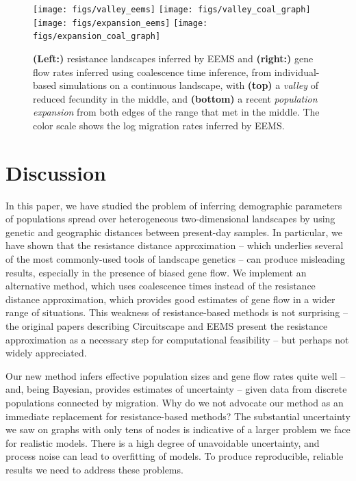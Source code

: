 \documentclass{article}
\begin{document}
\begin{figure}
\centering
    \texttt{[image: figs/valley\_eems]}
    \texttt{[image: figs/valley\_coal\_graph]}
    \texttt{[image: figs/expansion\_eems]}
    \texttt{[image: figs/expansion\_coal\_graph]}
    \caption{
        \textbf{(Left:)}
        resistance landscapes inferred by EEMS
        and 
        \textbf{(right:)}
        gene flow rates inferred using coalescence time inference,
        from individual-based simulations on a continuous landscape,
        with \textbf{(top)} a \emph{valley} of reduced fecundity in the middle, and
        \textbf{(bottom)} a recent \emph{population expansion} from both edges of the range
        that met in the middle.
        The color scale shows the log migration rates inferred by EEMS.
        \label{fig:more_barriers}
    }
\end{figure}


\section*{Discussion}

In this paper, we have studied the problem of
inferring demographic parameters of populations spread over heterogeneous two-dimensional landscapes
by using genetic and geographic distances between present-day samples.
In particular, we have shown that the resistance distance approximation
-- which underlies several of the most commonly-used tools of landscape genetics --
can produce misleading results, especially in the presence of biased gene flow.
We implement an alternative method, 
which uses coalescence times instead of the resistance distance approximation,
which provides good estimates of gene flow in a wider range of situations.
This weakness of resistance-based methods is not surprising --
the original papers describing Circuitscape \citep{mcrae_circuitscape} and EEMS \citep{petkova_eems}
present the resistance approximation as a necessary step for computational feasibility --
but perhaps not widely appreciated.

Our new method infers effective population sizes and gene flow rates quite well 
-- and, being Bayesian, provides estimates of uncertainty --
given data from discrete populations connected by migration.
Why do we not advocate our method as an immediate replacement for resistance-based methods?
The substantial uncertainty we saw on graphs with only tens of nodes
is indicative of a larger problem we face for realistic models.
There is a high degree of unavoidable uncertainty,
and process noise can lead to overfitting of models.
To produce reproducible, reliable results we need to address these problems.
\end{document}
